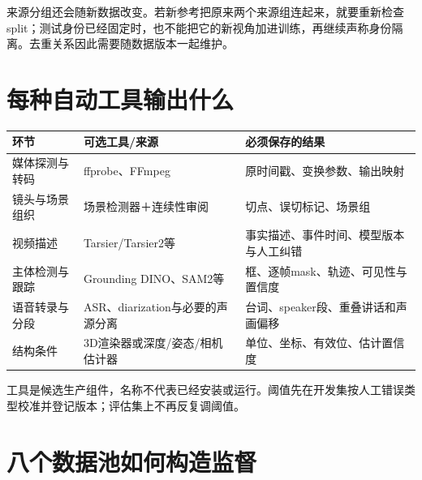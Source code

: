来源分组还会随新数据改变。若新参考把原来两个来源组连起来，就要重新检查 split；测试身份已经固定时，也不能把它的新视角加进训练，再继续声称身份隔离。去重关系因此需要随数据版本一起维护。

\section{每种自动工具输出什么}\label{seedance-m25-ux6bcfux79cdux81eaux52a8ux5de5ux5177ux8f93ux51faux4ec0ux4e48}

{\def\LTcaptype{table} %
\small\setlength{\tabcolsep}{3pt}\renewcommand{\arraystretch}{1.18}
\begin{longtable}[]{@{}
  >{\raggedright\arraybackslash}p{}
  >{\raggedright\arraybackslash}p{}
  >{\raggedright\arraybackslash}p{}@{}}
\toprule\noalign{}
\begin{minipage}[b]{\linewidth}\raggedright
环节
\end{minipage} & \begin{minipage}[b]{\linewidth}\raggedright
可选工具/来源
\end{minipage} & \begin{minipage}[b]{\linewidth}\raggedright
必须保存的结果
\end{minipage} \\
\midrule\noalign{}
\endhead
\bottomrule\noalign{}
\endlastfoot
媒体探测与转码 & ffprobe、FFmpeg & 原时间戳、变换参数、输出映射 \\
镜头与场景组织 & 场景检测器＋连续性审阅 & 切点、误切标记、场景组 \\
视频描述 & Tarsier/Tarsier2等 & 事实描述、事件时间、模型版本与人工纠错 \\
主体检测与跟踪 & Grounding DINO、SAM2等 & 框、逐帧mask、轨迹、可见性与置信度 \\
语音转录与分段 & ASR、diarization与必要的声源分离 & 台词、speaker段、重叠讲话和声画偏移 \\
结构条件 & 3D渲染器或深度/姿态/相机估计器 & 单位、坐标、有效位、估计置信度 \\
\end{longtable}
}

工具是候选生产组件，名称不代表已经安装或运行。阈值先在开发集按人工错误类型校准并登记版本；评估集上不再反复调阈值。

\section{八个数据池如何构造监督}\label{seedance-m25-ux516bux4e2aux6570ux636eux6c60ux5982ux4f55ux6784ux9020ux76d1ux7763}

